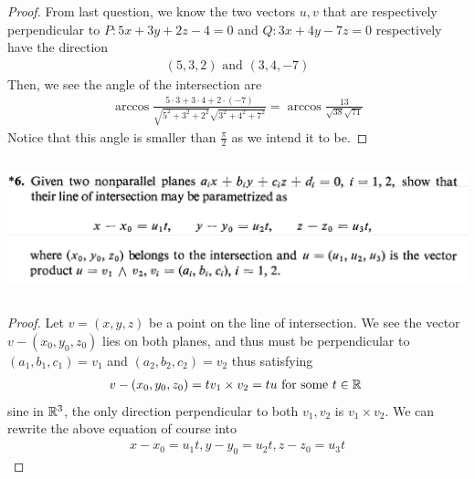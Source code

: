 \documentclass{report}
\begin{document}
\begin{proof}
From last question, we know the two vectors $u,v$ that are respectively perpendicular to  $P:5x+3y+2z-4=0$ and  $Q:3x+4y-7z=0$ respectively have the direction 
 \begin{align*}
   (5,3,2)\text{ and }(3,4,-7)
\end{align*}
Then, we see the angle of the intersection are 
\begin{align*}
\arccos \frac{5\cdot 3+3\cdot 4 +2 \cdot (-7)}{\sqrt{5^2+3^2+2^2} \sqrt{3^2+4^2+7^2} }=\arccos \frac{13}{\sqrt{38}\sqrt{71}  }
\end{align*}
Notice that this angle is smaller than $\frac{\pi}{2}$ as we intend it to be. 
\end{proof}
\begin{question}{}{}
\includegraphics[height=4cm,width=18cm]{qu12}
\end{question}
\begin{proof}
Let $v=(x,y,z)$ be a point on the line of intersection.  We see the vector  $v-(x_0,y_0,z_0)$ lies on both planes, and thus must be perpendicular to $(a_1,b_1,c_1)=v_1$ and $(a_2,b_2,c_2)=v_2$ thus satisfying 
\begin{align*}
v-(x_0,y_0,z_0)=tv_1\times v_2=tu\text{ for some $t\in\mathbb{R}$ }
\end{align*}
sine in $\mathbb{R}^3$, the only direction perpendicular to both  $v_1,v_2$ is  $v_1\times v_2$. We can rewrite the above equation of course into 
\begin{align*}
x-x_0=u_1t,y-y_0=u_2t,z-z_0=u_3t
\end{align*}
\end{proof}
\end{document}
